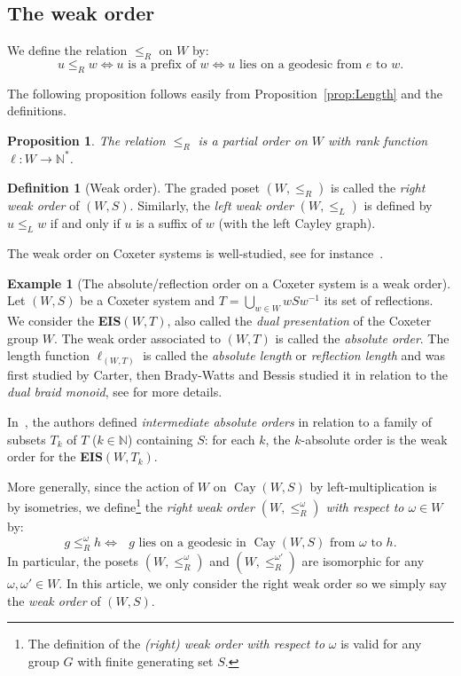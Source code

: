 \documentclass[A4paper, oneside]{amsart}
\newcommand{\id}{\textit{e}}
\newcommand{\Cay}{\operatorname{Cay}}
\newcommand{\EIS}{\textnormal{\bf EIS}\xspace}
\newtheorem{prop}[thm]{Proposition}
\theoremstyle{definition}
\newtheorem{defi}[thm]{Definition}
\newtheorem{ex}[thm]{Example}
\begin{document}
\subsection{The weak order} 
\label{ss:WeakOrder}

We define the relation $\leq_R$ on $W$ by:
$$
u\leq_R w \iff u \text{ is a prefix of }w \iff u \textrm{ lies on  a geodesic from $\id$ to $w$}. 
$$

The following proposition follows easily from Proposition~\ref{prop:Length} and the definitions. 

\begin{prop} The relation $\leq_R$ is a partial order on $W$ with rank function $\ell:W\to \mathbb N^*$.
\end{prop}

\begin{defi}[Weak order] The graded poset $(W,\leq_R)$ is called the {\em right weak order} of $(W,S)$. Similarly, the {\em left weak order} $(W,\leq_L)$ is defined by $u\leq_L w$ if and only if $u$ is a suffix of $w$ (with the left Cayley graph). 
\end{defi}

The weak order on Coxeter systems is well-studied, see for instance~\cite[Chapter~3]{BjBr05}.  


\begin{ex}[The absolute/reflection order on a Coxeter system is a weak order]
\label{ex:Absolute}
Let $(W,S)$ be a Coxeter system and $T=\bigcup_{w\in W}wSw^{-1}$ its set of reflections. We consider the \EIS $(W,T)$, also called the {\em dual presentation} of the Coxeter group $W$. The weak order associated to $(W,T)$ is called the {\em absolute order}.  The length function $\ell_{(W,T)}$ is called the {\em absolute length} or {\em reflection length} and was first studied by Carter, then Brady-Watts and Bessis studied it in relation to the {\em dual braid monoid}, see \cite{Be03,Arm09} for more details. 

In~\cite[\S4]{CaDySe23}, the authors defined {\em intermediate absolute orders} in relation to a family of subsets $T_k$ of $T$ ($k\in\mathbb N$) containing $S$: for each $k$, the $k$-absolute order is the weak order for the \EIS $(W,T_k)$. 
\end{ex}

More generally,  since the action of $W$ on $\Cay(W,S)$ by left-multiplication is by isometries, we define\footnote{The definition of the \emph{(right) weak order with respect to} $\omega$ is valid for any group $G$  with finite generating set $S$.} the {\em right weak order $(W, \leq_R^\omega)$ with respect to $\omega\in W$} by:
\begin{equation}\label{eq:Weak}
 g \leq_R^{\omega} h\iff\textrm{ $g$ lies on a geodesic in $\Cay(W,S)$ from $\omega$ to $h$.}
 \end{equation}
 In particular, the posets $(W, \leq_R^{\omega})$ and $(W, \leq_R^{\omega'})$ are isomorphic for any $\omega,\omega' \in W$. In this article, we only consider the right weak order so we simply say the {\em weak order} of $(W,S)$.
\end{document}
